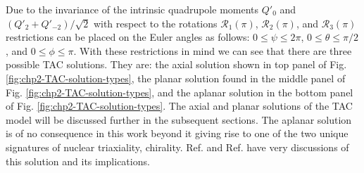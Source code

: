 Due to the invariance of the intrinsic quadrupole moments $Q'_0$ and $(Q'_2+Q'_{-2})/\sqrt{2}$ with respect to the rotations $\mathscr{R}_1(\pi)$, $\mathscr{R}_2(\pi)$, and $\mathscr{R}_3(\pi)$ restrictions can be placed on the Euler angles as follows: $0\leq\psi\leq{}2\pi$, $0\leq\theta\leq\pi/2$, and $0\leq\phi\leq\pi$. With these restrictions in mind we can see that there are three possible TAC solutions. They are: the axial solution shown in top panel of Fig. \ref{fig:chp2-TAC-solution-types}, the planar solution found in the middle panel of Fig. \ref{fig:chp2-TAC-solution-types}, and the aplanar solution in the bottom panel of Fig. \ref{fig:chp2-TAC-solution-types}. The axial and planar solutions of the TAC model will be discussed further in the subsequent sections. The aplanar solution is of no consequence in this work beyond it giving rise to one of the two unique signatures of nuclear triaxiality, chirality. Ref. \cite{frauendorfTAC} and Ref. \cite{frauendorfChirality} have very discussions of this solution and its implications.
